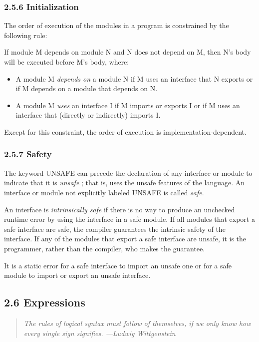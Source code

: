 \documentclass[10pt]{article}
\begin{document}
\subsubsection*{2.5.6 Initialization}

The order of execution of the modules in a program is constrained by the
following rule:

If module M depends on module N and N does not depend on M, then N's body will
be executed before M's body, where:
\begin{itemize}
\item A module M \emph{depends on} a module N if M uses an interface that N
  exports or if M depends on a module that depends on N.
\item A module M \emph{uses} an interface I if M imports or exports I or if M
  uses an interface that (directly or indirectly) imports I.
\end{itemize}

Except for this constraint, the order of execution is
implementation-dependent.

\subsubsection*{2.5.7 Safety}

The keyword UNSAFE can precede the declaration of any interface or module to
indicate that it is \emph{unsafe} ; that is, uses the unsafe features of the
language.  An interface or module not explicitly labeled UNSAFE is called
\emph{safe}.

An interface is \emph{intrinsically safe} if there is no way to produce an
unchecked runtime error by using the interface in a safe module.  If all
modules that export a safe interface are safe, the compiler guarantees the
intrinsic safety of the interface.  If any of the modules that export a safe
interface are unsafe, it is the programmer, rather than the compiler, who
makes the guarantee.

It is a static error for a safe interface to import an unsafe one or for a
safe module to import or export an unsafe interface.

\subsection*{2.6 Expressions}

\begin{quote}
  \emph{ The rules of logical syntax must follow of themselves, if we only
    know how every single sign signifies.  ---Ludwig Wittgenstein }
\end{quote}
\end{document}
